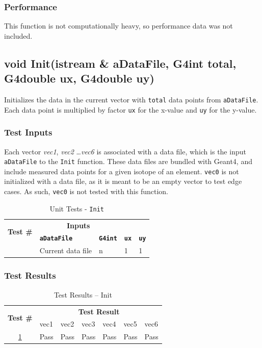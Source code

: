 \documentclass[12pt]{article}
\newcounter{TestCounter}
\begin{document}
	\subsubsection{Performance}
		This function is not computationally heavy, so performance data was not included.

\subsection{void Init(istream \& aDataFile, G4int total, G4double ux, G4double uy)} 
	
	Initializes the data in the current vector with \texttt{total} data points from \texttt{aDataFile}. Each data
	point is multiplied by factor \texttt{ux} for the x-value and \texttt{uy} for the y-value.

	\subsubsection{Test Inputs}
		Each vector \emph{vec1}, \emph{vec2} \ldots \emph{vec6} is associated with a data file, which is the input \texttt{aDataFile} to
		the \texttt{Init} function. These data files are bundled with Geant4, and include measured data points for 
		a given isotope of an element. \texttt{vec0} is not initialized with a data file, as it is meant to be an empty vector to test edge cases.
		As such, \texttt{vec0} is not tested with this function.
		\begin{table}[H]
		\centering
		\caption{Unit Tests - \texttt{Init}}\label{Init_unit}
		\begin{tabular}{lllll}
		\toprule
		\multirow{2}{*}{\bf Test \#}  & \multicolumn{2}{c}{\bf Inputs}\\
		& \bf \texttt{aDataFile} & \bf \texttt{G4int} & \bf \texttt{ux} & \bf \texttt{uy}\\\midrule
		{TestCounter}\arabic{TestCounter}\label{Init_0} & Current data file & n & 1 & 1\\
		\bottomrule
		\end{tabular}
		\end{table}
	\subsubsection{Test Results}
		\begin{table}[H]
		\centering
		\caption{Test Results -- Init}\label{Init_acc}
		\begin{tabular}{cllllll}
		\toprule
		\multirow{2}{*}{\bf Test \#} & \multicolumn{6}{c}{\bf Test Result}\\
		& vec1 & vec2 & vec3 & vec4 & vec5 & vec6\\\midrule
		\ref{Init_0} & Pass & Pass & Pass & Pass & Pass & Pass\\
		\bottomrule
		\end{tabular}
		\end{table}
\end{document}
